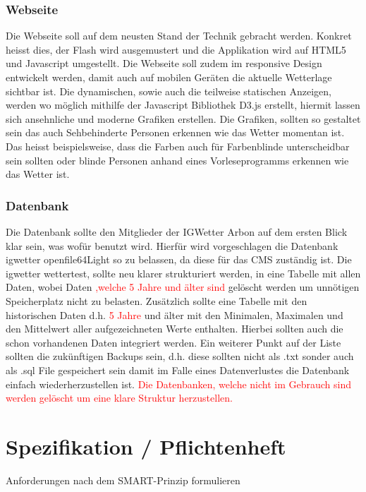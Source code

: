 \documentclass[a4paper,ngerman, 11pt]{report}
\newcommand\Diskussionspunkt[1]{\textcolor{red}{#1}}
\begin{document}
\subsection{Webseite}
Die Webseite soll auf dem neusten Stand der Technik gebracht werden. Konkret heisst dies, der Flash wird ausgemustert und die Applikation wird auf HTML5 und Javascript umgestellt. Die Webseite soll zudem im responsive Design entwickelt werden, damit auch auf mobilen Geräten die aktuelle Wetterlage sichtbar ist. Die dynamischen, sowie auch die teilweise statischen Anzeigen, werden wo möglich mithilfe der Javascript Bibliothek D3.js erstellt, hiermit lassen sich ansehnliche und moderne Grafiken erstellen. Die Grafiken, sollten so gestaltet sein das auch Sehbehinderte Personen erkennen wie das Wetter momentan ist. Das heisst beispielsweise, dass die Farben auch für Farbenblinde unterscheidbar sein sollten oder blinde Personen anhand eines Vorleseprogramms erkennen wie das Wetter ist. 

\subsection{Datenbank}
Die Datenbank sollte den Mitglieder der IGWetter Arbon auf dem ersten Blick klar sein, was wofür benutzt wird. Hierfür wird vorgeschlagen die Datenbank igwetter openfile64Light so zu belassen, da diese für das CMS zuständig ist. Die igwetter wettertest, sollte neu klarer strukturiert werden, in eine Tabelle mit allen Daten, wobei Daten \Diskussionspunkt{,welche 5 Jahre und älter sind} gelöscht werden um unnötigen Speicherplatz nicht zu belasten. Zusätzlich sollte eine Tabelle mit den historischen Daten d.h. \Diskussionspunkt{5 Jahre} und älter mit den Minimalen, Maximalen und den Mittelwert aller aufgezeichneten Werte enthalten. Hierbei sollten auch die schon vorhandenen Daten integriert werden. Ein weiterer Punkt auf der Liste sollten die zukünftigen Backups sein, d.h. diese sollten nicht als .txt sonder auch als .sql File gespeichert sein damit im Falle eines Datenverlustes die Datenbank einfach wiederherzustellen ist. \Diskussionspunkt{Die Datenbanken, welche nicht im Gebrauch sind werden gelöscht um eine klare Struktur herzustellen.}


\chapter{Spezifikation / Pflichtenheft}
Anforderungen nach dem SMART-Prinzip formulieren
   
\end{document}
